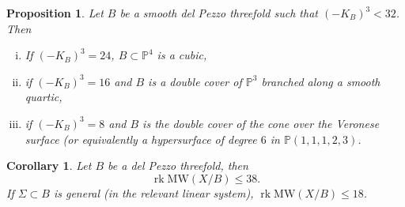 \documentclass[11pt]{amsart}
\newtheorem{proposition}[theorem]{Proposition}
\newtheorem{corollary}[theorem]{Corollary}
\theoremstyle{definition}
\theoremstyle{definition}
\theoremstyle{remark}
\theoremstyle{remark}
\theoremstyle{definition}
\theoremstyle{conjecture}
\newcommand{\MW}{\mathrm{MW}}
\begin{document}
\begin{proposition}\label{prop:delpezzoleq32}\cite[Table 1]{Prokhorov_2025} Let $B$ be a smooth del Pezzo threefold 
such that $ (-K_B)^3 <32$. Then 
\begin{enumerate}[(i)]
    \item  If $(-K_B)^3 =24$, $B \subset \mathbb{P}^4$ is a cubic,
    \item if $(-K_B)^3 =16$ and $B$ is a double cover of $\mathbb{P}^3 $ branched along a smooth quartic, 
    \item  if $(-K_B)^3 =8$ and $B$ is the double cover of the cone over the Veronese surface (or equivalently a hypersurface of degree $6$ in $\mathbb{P}(1,1,1,2,3)$.
\end{enumerate}
\end{proposition}
\begin{corollary} Let   $B$ be a del Pezzo threefold, then 
\[\operatorname{rk} \MW(X/B)   \leq {38}.\]
If $\Sigma \subset B$ is general (in the relevant linear system),  $\operatorname{rk} \MW(X/B)   \leq {18}$.
\end{corollary}
\end{document}
